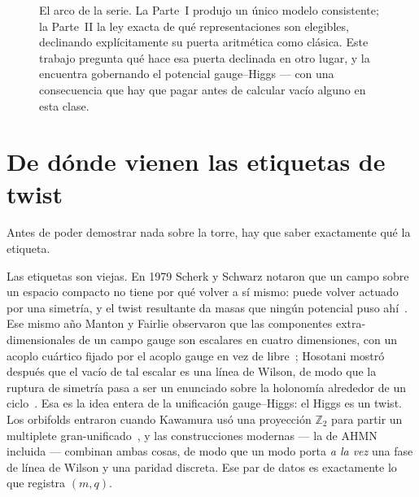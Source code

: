 \documentclass[11pt,a4paper]{article}
\newcommand{\ZZ}{\mathbb{Z}}
\begin{document}
\begin{figure}[t]
{}
\caption{El arco de la serie. La Parte~I produjo un único modelo consistente; la Parte~II la
ley exacta de qué representaciones son elegibles, declinando explícitamente su puerta
aritmética como clásica. Este trabajo pregunta qué hace esa puerta declinada en otro lugar, y
la encuentra gobernando el potencial gauge--Higgs --- con una consecuencia que hay que pagar
antes de calcular vacío alguno en esta clase.}
\label{fig:roadmap}
\end{figure}

\section{De dónde vienen las etiquetas de twist}\label{sec:projection}
Antes de poder demostrar nada sobre la torre, hay que saber exactamente qué la etiqueta.

Las etiquetas son viejas. En 1979 Scherk y Schwarz notaron que un campo sobre un espacio
compacto no tiene por qué volver a sí mismo: puede volver actuado por una simetría, y el
twist resultante da masas que ningún potencial puso ahí~\cite{ScherkSchwarz}. Ese mismo año
Manton y Fairlie observaron que las componentes extra-dimensionales de un campo gauge son
escalares en cuatro dimensiones, con un acoplo cuártico fijado por el acoplo gauge en vez de
libre~\cite{Manton,Fairlie}; Hosotani mostró después que el vacío de tal escalar es una línea
de Wilson, de modo que la ruptura de simetría pasa a ser un enunciado sobre la holonomía
alrededor de un ciclo~\cite{Hosotani}. Esa es la idea entera de la unificación gauge--Higgs:
el Higgs es un twist. Los orbifolds entraron cuando Kawamura usó una proyección $\ZZ_2$ para
partir un multiplete gran-unificado~\cite{KawamuraGUT}, y las construcciones modernas --- la
de AHMN incluida --- combinan ambas cosas, de modo que un modo porta \emph{a la vez} una fase
de línea de Wilson y una paridad discreta. Ese par de datos es exactamente lo que registra
$(m,q)$.
\end{document}

